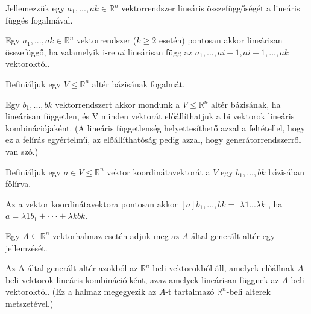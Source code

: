 \begin{frame}
  \begin{tcolorbox}[title={5}]
    Jellemezzük egy $a_1,...,ak \in \mathbb{R}^n$ vektorrendszer lineáris összefüggőségét a lineáris függés fogalmával.


  \tcblower
Egy $a_1,...,ak \in \mathbb{R}^n$ vektorrendszer ($k \geq 2$ esetén) pontosan akkor lineárisan összefüggő, ha valamelyik i-re $ai$ lineárisan függ az $a_1,...,ai-1,ai+1,...,ak$ vektoroktól.
  \end{tcolorbox}
\end{frame}


\begin{frame}
  \begin{tcolorbox}[title={6}]
      Definiáljuk egy $V \leq \mathbb{R}^n$ altér bázisának fogalmát.


  \tcblower
Egy $b_1,...,bk$ vektorrendszert akkor mondunk a $V \leq \mathbb{R}^n$ altér bázisának, ha lineárisan független, és V minden vektorát előállíthatjuk a bi vektorok lineáris kombinációjaként. (A lineáris függetlenség helyettesíthető azzal a feltétellel, hogy ez a felírás egyértelmű, az előállíthatóság pedig azzal, hogy generátorrendszerről van szó.)
  \end{tcolorbox}
\end{frame}


\begin{frame}
  \begin{tcolorbox}[title={7}]
      Definiáljuk egy $a \in V \leq \mathbb{R}^n$ vektor koordinátavektorát a $V$ egy $b_1,...,bk$ bázisában fölírva.


  \tcblower
Az a vektor koordinátavektora pontosan akkor $[a]b_1,...,bk =$
${\lambda}1 . . . {\lambda}k$
, ha $a = {\lambda}1b_1+ \cdot  \cdot  \cdot +{\lambda}kbk$.
  \end{tcolorbox}
\end{frame}


\begin{frame}
  \begin{tcolorbox}[title={8}]
       Egy $A {\subseteq} \mathbb{R}^n$ vektorhalmaz esetén adjuk meg az $A$ által generált altér egy jellemzését.


  \tcblower
Az A által generált altér azokból az $\mathbb{R}^n$-beli vektorokból áll, amelyek előállnak $A$-beli vektorok lineáris kombinációiként, azaz amelyek lineárisan függnek az $A$-beli vektoroktól. (Ez a halmaz megegyezik az $A$-t tartalmazó $\mathbb{R}^n$-beli alterek metszetével.)

  \end{tcolorbox}
\end{frame}



